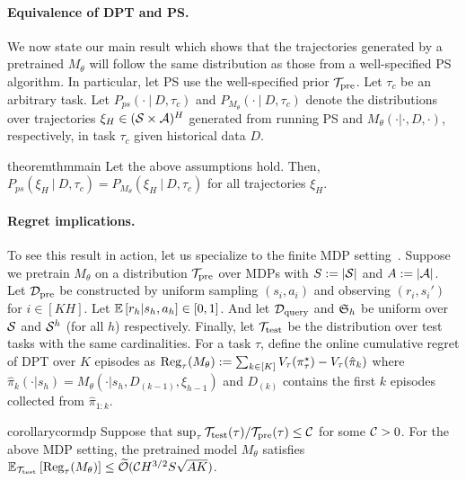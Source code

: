 \paragraph{Equivalence of DPT and PS.} We now state our main result which shows that the trajectories generated by a pretrained $M_{\theta}$ will follow the same distribution as those from a well-specified PS algorithm. In particular, let PS use the well-specified prior ${\mathcal{T}}_{\text{pre}}$. Let $\tau_c$ be an arbitrary task. 
Let $P_{ps}(\cdot \ |\  D, \tau_c)$ and $P_{M_{\theta}}(\cdot \ | \ D, \tau_c)$ denote the distributions over trajectories $\xi_H \in ({\mathcal{S}} \times \mathcal{A})^{H}$ generated from running PS and $M_{\theta}(\cdot | \cdot, D, \cdot)$, respectively, in task $\tau_c$ given historical data $D$.

\begin{restatable}{theorem}{thmmain}
\label{thm:main}
Let the above assumptions hold. Then, $P_{ps}(\xi_H  \ | \ D, \tau_c) = P_{M_{\theta}} (\xi_H \ | \ D, \tau_c)$ for all trajectories $\xi_H$.
\end{restatable}


\paragraph{Regret implications.} To see this result in action, let us specialize to the finite MDP setting~\citep{osband2013more}. Suppose we pretrain $M_{\theta}$ on a distribution ${\mathcal{T}}_{\text{pre}}$ over MDPs with $S := |{\mathcal{S}}|$ and $A := |\mathcal{A}|$. Let $\mathcal{D}_{\text{pre}}$ be constructed by uniform sampling $(s_i, a_i)$ and observing $(r_i, s_i')$ for $i \in [KH]$. Let $\mathbb{E}\left[r_h | s_h, a_h\right] \in [0, 1]$. And let $\mathcal{D}_{\text{query}}$ and ${\mathfrak{S}}_h$ be uniform over ${\mathcal{S}}$ and ${\mathcal{S}}^h$ (for all $h$) respectively. Finally, let ${\mathcal{T}}_{\text{test}}$ be the distribution over test tasks with the same cardinalities.
For a task $\tau$, define the online cumulative regret of DPT over $K$ episodes as   $\text{Reg}_\tau(M_{\theta}) := \sum_{k \in [K]} V_\tau(\pi^{\star}_\tau) - V_\tau(\hat \pi_k)$ where $\hat \pi_k(\cdot |s_h) = M_{\theta} (\cdot  | s_h, D_{(k - 1)}, \xi_{h - 1})$ and $D_{(k)}$ contains the first $k$ episodes collected from $\hat \pi_{1:k}$.
\begin{restatable}{corollary}{cormdp}
\label{cor:mdp}
    Suppose that $\sup_{\tau} {{\mathcal{T}}_{\text{test}}(\tau)}/{{\mathcal{T}}_{\text{pre}}(\tau)} \leq \mathcal{C}$ for some $\mathcal{C} > 0$. For the above MDP setting, the pretrained model $M_{\theta}$ satisfies
   $\mathbb{E}_{{\mathcal{T}}_{\text{test}}} \left[ \text{Reg}_\tau(M_{\theta}) \right]  \leq \widetilde{\mathcal{O}} (  \mathcal{C} H^{3/2}S\sqrt{ A K }) $.
\end{restatable}

